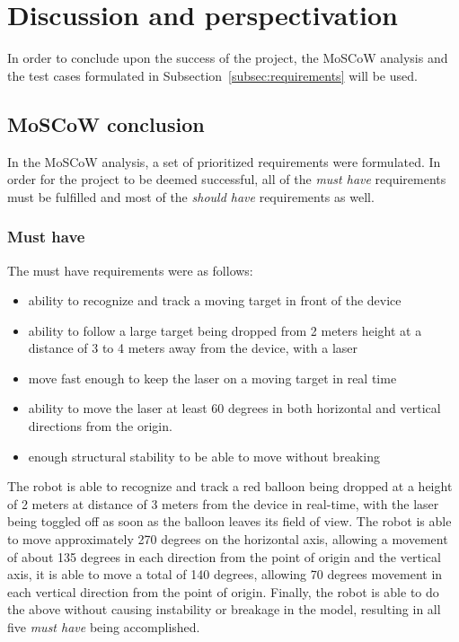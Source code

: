 \section{Discussion and perspectivation}
In order to conclude upon the success of the project, the MoSCoW analysis and the test cases formulated in Subsection~\ref{subsec:requirements} will be used.

\subsection{MoSCoW conclusion}
In the MoSCoW analysis, a set of prioritized requirements were formulated.
In order for the project to be deemed successful, all of the \textit{must have} requirements must be fulfilled and most of the \textit{should have} requirements as well.

\subsubsection{Must have}
The must have requirements were as follows:
\begin{itemize}
	\item ability to recognize and track a moving target in front of the device
	\item ability to follow a large target being dropped from 2 meters height at a distance of 3 to 4 meters away from the device, with a laser
	\item move fast enough to keep the laser on a moving target in real time
	\item ability to move the laser at least 60 degrees in both horizontal and vertical directions from the origin.
	\item enough structural stability to be able to move without breaking
\end{itemize}

The robot is able to recognize and track a red balloon being dropped at a height of 2 meters at distance of 3 meters from the device in real-time, with the laser being toggled off as soon as the balloon leaves its field of view. 
The robot is able to move approximately 270 degrees on the horizontal axis, allowing a movement of about 135 degrees in each direction from the point of origin and the vertical axis, it is able to move a total of 140 degrees, allowing 70 degrees movement in each vertical direction from the point of origin.
Finally, the robot is able to do the above without causing instability or breakage in the model, resulting in all five \textit{must have} being accomplished.


